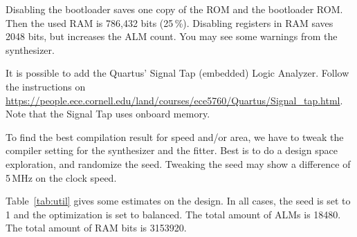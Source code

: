 \documentclass[12pt]{article}
\begin{document}
Disabling the bootloader saves one copy of the ROM and the bootloader ROM. Then the used RAM is 786,432 bits (25\,\%). Disabling registers in RAM saves 2048 bits, but increases the ALM count. You may see some warnings from the synthesizer.

It is possible to add the Quartus' Signal Tap (embedded) Logic Analyzer. Follow the instructions on \url{https://people.ece.cornell.edu/land/courses/ece5760/Quartus/Signal_tap.html}. Note that the Signal Tap uses onboard memory.

To find the best compilation result for speed and/or area, we have to tweak the compiler setting for the synthesizer and the fitter. Best is to do a design space exploration, and randomize the seed. Tweaking the seed may show a difference of 5\,MHz on the clock speed.

Table~\ref{tab:util} gives some estimates on the design. In all cases, the seed is set to 1 and the optimization is set to balanced. The total amount of ALMs is 18480. The total amount of RAM bits is 3153920.

\end{document}
